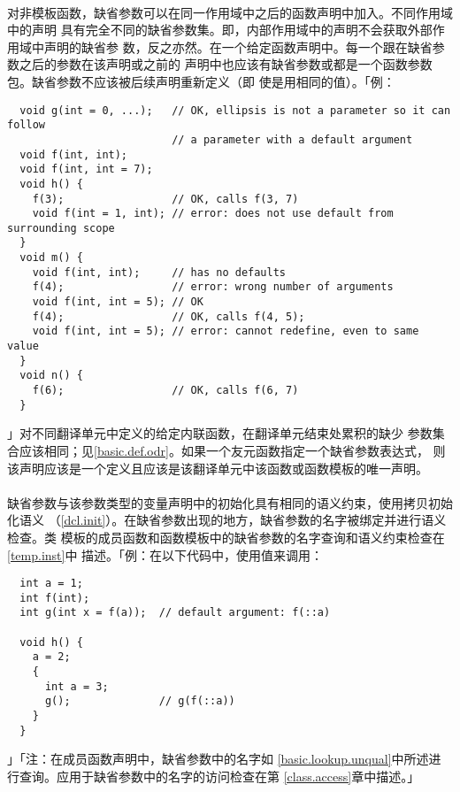 \paragraph{}
对非模板函数，缺省参数可以在同一作用域中之后的函数声明中加入。不同作用域中的声明
具有完全不同的缺省参数集。即，内部作用域中的声明不会获取外部作用域中声明的缺省参
数，反之亦然。在一个给定函数声明中。每一个跟在缺省参数之后的参数在该声明或之前的
声明中也应该有缺省参数或都是一个函数参数包。缺省参数不应该被后续声明重新定义（即
使是用相同的值）。「例：
\begin{lstlisting}
  void g(int = 0, ...);   // OK, ellipsis is not a parameter so it can follow
                          // a parameter with a default argument
  void f(int, int);
  void f(int, int = 7);
  void h() {
    f(3);                 // OK, calls f(3, 7)
    void f(int = 1, int); // error: does not use default from surrounding scope
  }
  void m() {
    void f(int, int);     // has no defaults
    f(4);                 // error: wrong number of arguments
    void f(int, int = 5); // OK
    f(4);                 // OK, calls f(4, 5);
    void f(int, int = 5); // error: cannot redefine, even to same value
  }
  void n() {
    f(6);                 // OK, calls f(6, 7)
  }
\end{lstlisting}」对不同翻译单元中定义的给定内联函数，在翻译单元结束处累积的缺少
参数集合应该相同；见\ref{basic.def.odr}。如果一个友元函数指定一个缺省参数表达式，
则该声明应该是一个定义且应该是该翻译单元中该函数或函数模板的唯一声明。

\paragraph{}
缺省参数与该参数类型的变量声明中的初始化具有相同的语义约束，使用拷贝初始化语义
（\ref{dcl.init}）。在缺省参数出现的地方，缺省参数的名字被绑定并进行语义检查。类
模板的成员函数和函数模板中的缺省参数的名字查询和语义约束检查在\ref{temp.inst}中
描述。「例：在以下代码中，使用值来调用：
\begin{lstlisting}
  int a = 1;
  int f(int);
  int g(int x = f(a));  // default argument: f(::a)

  void h() {
    a = 2;
    {
      int a = 3;
      g();              // g(f(::a))
    }
  }
\end{lstlisting}」「注：在成员函数声明中，缺省参数中的名字如
\ref{basic.lookup.unqual}中所述进行查询。应用于缺省参数中的名字的访问检查在第
\ref{class.access}章中描述。」

